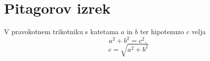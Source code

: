 \documentclass{article}
\begin{document}
\section*{Pitagorov izrek}
V pravokotnem trikotniku s katetama \(a\) in \(b\) ter hipotenuzo \(c\) velja
\[ a^2 + b^2 = c^2 .\ \] 
\[ c = \sqrt{a^2 + b^2}\]
\end{document}
